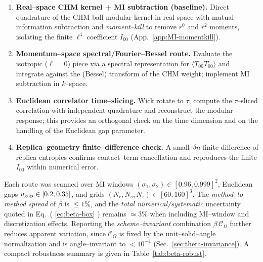 \documentclass[aps,prd,onecolumn,superscriptaddress,nofootinbib]{revtex4-2}
\begin{document}
\begin{enumerate}[leftmargin=1.3em,label=(\alph*)]
\item \textbf{Real–space CHM kernel + MI subtraction (baseline).} Direct quadrature of the CHM ball modular kernel in real space with mutual–information subtraction and \emph{moment–kill} to remove $r^0$ and $r^2$ moments, isolating the finite $\ell^4$ coefficient $I_{00}$ (App.~\ref{app:MI-momentkill}).

\item \textbf{Momentum–space spectral/Fourier–Bessel route.} Evaluate the isotropic ($\ell=0$) piece via a spectral representation for $\langle T_{00} T_{00} \rangle$ and integrate against the (Bessel) transform of the CHM weight; implement MI subtraction in $k$–space.

\item \textbf{Euclidean correlator time–slicing.} Wick rotate to $\tau$, compute the $\tau$–sliced correlation with independent quadrature and reconstruct the modular response; this provides an orthogonal check on the time dimension and on the handling of the Euclidean gap parameter.

\item \textbf{Replica–geometry finite–difference check.} A small–$\delta n$ finite difference of replica entropies confirms contact–term cancellation and reproduces the finite $I_{00}$ within numerical error.
\end{enumerate}

Each route was scanned over MI windows $(\sigma_1,\sigma_2)\in[0.96,0.999]^2$, Euclidean gaps $u_{\rm gap}\in[0.2,0.35]$, and grids $(N_r,N_s,N_\tau)\in[60,160]^3$. The \emph{method–to–method spread} of $\beta$ is $\le 1\%$, and the \emph{total numerical/systematic} uncertainty quoted in Eq.~( \ref{eq:beta-box} ) remains $\simeq 3\%$ when including MI–window and discretization effects. Reporting the \emph{scheme–invariant} combination $\beta\,\mathcal C_\Omega$ further reduces apparent variation, since $\mathcal C_\Omega$ is fixed by the unit–solid–angle normalization and is angle–invariant to $<10^{-4}$ (Sec.~\ref{sec:theta-invariance}). A compact robustness summary is given in Table~\ref{tab:beta-robust}.
\end{document}
